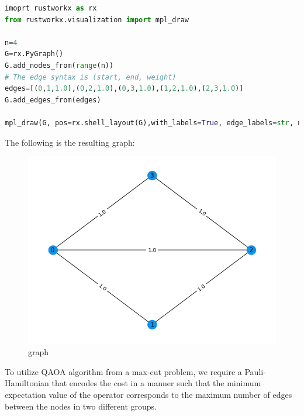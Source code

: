 \documentclass[12pt, oneside]{book}
\theoremstyle{definition}
\theoremstyle{definition}
\theoremstyle{remark}
\begin{document}
\begin{lstlisting}[language=Python]
imoprt rustworkx as rx
from rustworkx.visualization import mpl_draw

n=4
G=rx.PyGraph()
G.add_nodes_from(range(n))
# The edge syntax is (start, end, weight)
edges=[(0,1,1.0),(0,2,1.0),(0,3,1.0),(1,2,1.0),(2,3,1.0)]
G.add_edges_from(edges)

mpl_draw(G, pos=rx.shell_layout(G),with_labels=True, edge_labels=str, node_color="#1192E8")
\end{lstlisting}
The following is the resulting graph:
\begin{figure}
    \centering
    \includegraphics[width=0.5\linewidth]{../images/graph.png}
    \caption{graph}
    \label{fig:graph}
\end{figure}

To utilize QAOA algorithm from a max-cut problem, we require a Pauli-Hamiltonian that encodes the cost in a manner such that the minimum expectation value of the operator corresponds to the maximum number of edges between the nodes in two different groups.
\end{document}
